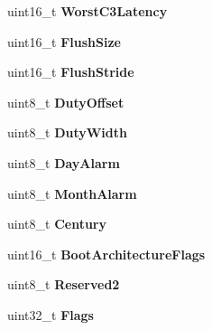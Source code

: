 \begin{DoxyCompactItemize}
\item 
uint16\+\_\+t {\bfseries Worst\+C3\+Latency}\hypertarget{structFADT_a13aae23b2990d8ccaf565bcc8e8f1b9e}{}\label{structFADT_a13aae23b2990d8ccaf565bcc8e8f1b9e}

\item 
uint16\+\_\+t {\bfseries Flush\+Size}\hypertarget{structFADT_a65d76248dc4632e69960e325b527063e}{}\label{structFADT_a65d76248dc4632e69960e325b527063e}

\item 
uint16\+\_\+t {\bfseries Flush\+Stride}\hypertarget{structFADT_a6e4de665628fcdf86a3faf82bde931a7}{}\label{structFADT_a6e4de665628fcdf86a3faf82bde931a7}

\item 
uint8\+\_\+t {\bfseries Duty\+Offset}\hypertarget{structFADT_aaa26778b0fdf746fda2d48728938016b}{}\label{structFADT_aaa26778b0fdf746fda2d48728938016b}

\item 
uint8\+\_\+t {\bfseries Duty\+Width}\hypertarget{structFADT_acb1e51d1bc2a04e629ac2e05d1e05ce9}{}\label{structFADT_acb1e51d1bc2a04e629ac2e05d1e05ce9}

\item 
uint8\+\_\+t {\bfseries Day\+Alarm}\hypertarget{structFADT_a439d85af84eab75fa82e615012da87dd}{}\label{structFADT_a439d85af84eab75fa82e615012da87dd}

\item 
uint8\+\_\+t {\bfseries Month\+Alarm}\hypertarget{structFADT_a5fd69e0e845a26704179c94310f2bfad}{}\label{structFADT_a5fd69e0e845a26704179c94310f2bfad}

\item 
uint8\+\_\+t {\bfseries Century}\hypertarget{structFADT_a018be4ab77ade20d044d498dab2e36da}{}\label{structFADT_a018be4ab77ade20d044d498dab2e36da}

\item 
uint16\+\_\+t {\bfseries Boot\+Architecture\+Flags}\hypertarget{structFADT_a089f556771f696c4a9c35bb9a857fdea}{}\label{structFADT_a089f556771f696c4a9c35bb9a857fdea}

\item 
uint8\+\_\+t {\bfseries Reserved2}\hypertarget{structFADT_a5b053d0739c578a1a054ad3a15bd62e9}{}\label{structFADT_a5b053d0739c578a1a054ad3a15bd62e9}

\item 
uint32\+\_\+t {\bfseries Flags}\hypertarget{structFADT_aff7644b36132ddbfb5d4c4c2ee1f828c}{}\label{structFADT_aff7644b36132ddbfb5d4c4c2ee1f828c}


\end{DoxyCompactItemize}
